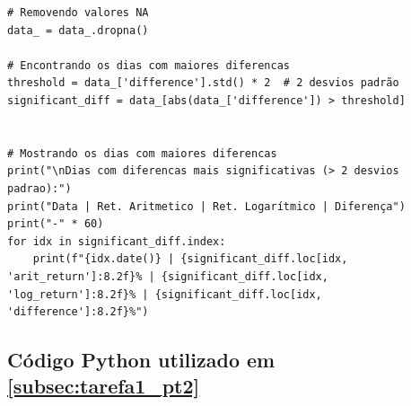 \documentclass[a4paper, 12pt]{article}
\begin{document}
\begin{lstlisting}[style=python]
# Removendo valores NA
data_ = data_.dropna()

# Encontrando os dias com maiores diferencas
threshold = data_['difference'].std() * 2  # 2 desvios padrão
significant_diff = data_[abs(data_['difference']) > threshold]


# Mostrando os dias com maiores diferencas
print("\nDias com diferencas mais significativas (> 2 desvios padrao):")
print("Data | Ret. Aritmetico | Ret. Logarítmico | Diferença")
print("-" * 60)
for idx in significant_diff.index:
    print(f"{idx.date()} | {significant_diff.loc[idx, 'arit_return']:8.2f}% | {significant_diff.loc[idx, 'log_return']:8.2f}% | {significant_diff.loc[idx, 'difference']:8.2f}%")
\end{lstlisting}

\subsection{Código Python utilizado em \ref{subsec:tarefa1_pt2}}\label{apendice:codigo_tarefa1_pt2}
\end{document}
